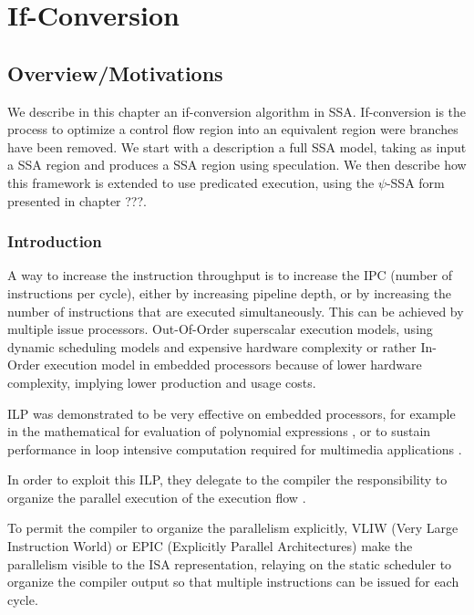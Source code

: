 \chapter{If-Conversion }
\graphicspath{{img/}{if_conversion/img/}{part4/if_conversion/img/}}
	
\newcommand\cond{~?~}


\section{Overview/Motivations}

We describe in this chapter an if-conversion algorithm in SSA. If-conversion is the process to optimize a control flow region into an equivalent region were branches have been removed. We start with a description a full SSA model, taking as input a SSA region and produces a SSA region using speculation. We then describe how this framework is extended to use predicated execution, using the $\psi$-SSA form presented in chapter ???. 

\subsection{Introduction}

A way to increase the instruction throughput is to increase the IPC (number of instructions per cycle), either by increasing pipeline depth, or by increasing the number of instructions that are executed simultaneously. This can be achieved by multiple issue processors. Out-Of-Order superscalar execution models, using dynamic scheduling models and expensive hardware complexity or rather In-Order execution model in embedded processors because of lower hardware complexity, implying lower production and usage costs.

ILP was demonstrated to be very effective on embedded processors, for example in the mathematical for evaluation of polynomial expressions \cite{Jeannerod:2010:TTI:1837210.1837212}, or to sustain performance in loop intensive computation required for multimedia applications \cite{FisherFaraboshiYoung}.

In order to exploit this ILP, they delegate to the compiler the responsibility to organize the parallel execution of the execution flow \cite{Rau:2003:IP:1074100.1074489}.

To permit the compiler to organize the parallelism explicitly, VLIW (Very Large Instruction World) or EPIC (Explicitly Parallel Architectures) make the parallelism visible to the ISA representation, relaying on the static scheduler to organize the compiler output so that multiple instructions can be issued for each cycle. 

